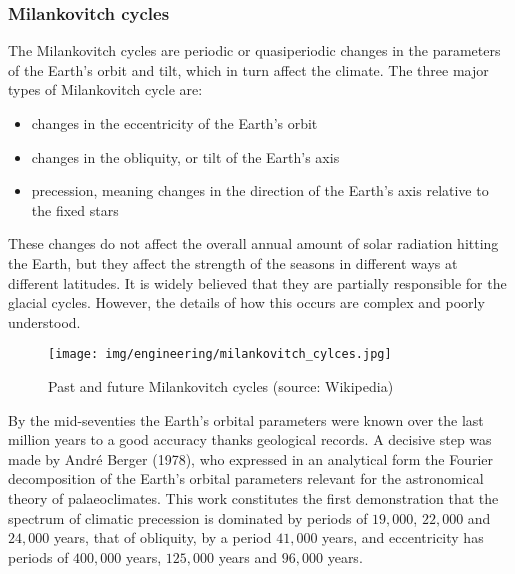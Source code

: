 	\subsubsection{Milankovitch cycles}\label{milankovic cycles}
	The Milankovitch cycles are periodic or quasiperiodic changes in the parameters of the Earth's orbit and tilt, which in turn affect the climate. The three major types of Milankovitch cycle are:
	\begin{itemize}
		\item changes in the eccentricity of the Earth's orbit
		\item changes in the obliquity, or tilt of the Earth's axis
		\item precession, meaning changes in the direction of the Earth's axis relative
to the fixed stars
	\end{itemize}
These changes do not affect the overall annual amount of solar radiation hitting the Earth, but they affect the strength of the seasons in different ways at different latitudes. It is widely believed that they are partially responsible for the glacial cycles. However, the details of how this occurs are complex and poorly understood.
	\begin{figure}[H]
		\begin{center}
			\texttt{[image: img/engineering/milankovitch\_cylces.jpg]}
		\end{center}	
		\caption[Past and future Milankovitch cycles]{Past and future Milankovitch cycles (source: Wikipedia)}
	\end{figure}
	\begin{tcolorbox}[title=Remark,colframe=black,arc=10pt]
	By the mid-seventies the Earth’s orbital parameters were known over the last million years to a good accuracy thanks geological records. A decisive step was made by  André Berger (1978), who expressed in an analytical form the Fourier decomposition of the Earth's orbital parameters relevant for the astronomical theory of palaeoclimates. This work constitutes the first demonstration that the spectrum of climatic precession is dominated by periods of $19,000$, $22,000$ and $24,000$ years, that of obliquity, by a period $41,000$ years, and eccentricity has periods of $400,000$ years, $125,000$ years and $96,000$ years. 
	\end{tcolorbox}
	
